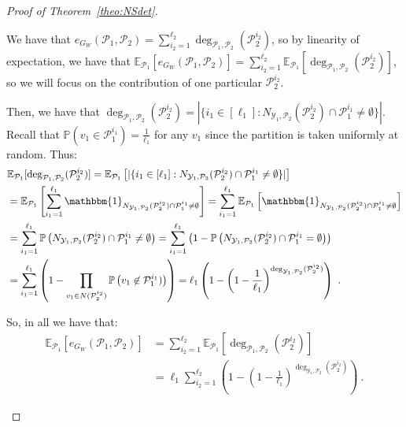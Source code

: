 \begin{proof}[Proof of Theorem~\ref{theo:NSdet}]
\begin{enumerate}
We have that $e_{G_W}(\mathcal{P}_1,\mathcal{P}_2) = \sum_{i_2=1}^{\ell_2}\deg_{\mathcal{P}_1,\mathcal{P}_2}(\mathcal{P}_2^{i_2})$, so by linearity of expectation, we have that $\mathbb{E}_{\mathcal{P}_1}[e_{G_W}(\mathcal{P}_1,\mathcal{P}_2)] = \sum_{i_2=1}^{\ell_2}\mathbb{E}_{\mathcal{P}_1}[\deg_{\mathcal{P}_1,\mathcal{P}_2}(\mathcal{P}_2^{i_2})]$, so we will focus on the contribution of one particular $\mathcal{P}_2^{i_2}$.

Then, we have that $\deg_{\mathcal{P}_1,\mathcal{P}_2}(\mathcal{P}_2^{i_2})=|\{i_1 \in [\ell_1]: N_{\mathcal{Y}_1,\mathcal{P}_2}(\mathcal{P}_2^{i_2}) \cap \mathcal{P}_1^{i_1} \not= \emptyset  \}|$. Recall that $\mathbb{P}\left(v_1 \in \mathcal{P}_1^{i_1}\right) = \frac{1}{\ell_1}$ for any $v_1$ since the partition is taken uniformly at random. Thus:
\begin{equation}
  \begin{aligned}
    &\mathbb{E}_{\mathcal{P}_1}[\deg_{\mathcal{P}_1,\mathcal{P}_2}(\mathcal{P}_2^{i_2})] = \mathbb{E}_{\mathcal{P}_1}\left[|\{i_1 \in [\ell_1]: N_{\mathcal{Y}_1,\mathcal{P}_2}(\mathcal{P}_2^{i_2}) \cap \mathcal{P}_1^{i_1} \not= \emptyset  \}|\right]\\
    &= \mathbb{E}_{\mathcal{P}_1}\left[\sum_{i_1=1}^{\ell_1} \mathbbm{1}_{N_{\mathcal{Y}_1,\mathcal{P}_2}(\mathcal{P}_2^{i_2}) \cap \mathcal{P}_1^{i_1} \not= \emptyset}\right]
    = \sum_{i_1 = 1}^{\ell_1} \mathbb{E}_{\mathcal{P}_1}\left[\mathbbm{1}_{N_{\mathcal{Y}_1,\mathcal{P}_2}(\mathcal{P}_2^{i_2}) \cap \mathcal{P}_1^{i_1} \not= \emptyset}\right]\\
    &= \sum_{i_1 = 1}^{\ell_1}\mathbb{P}\left(N_{\mathcal{Y}_1,\mathcal{P}_2}(\mathcal{P}_2^{i_2}) \cap \mathcal{P}_1^{i_1} \not= \emptyset\right)
    = \sum_{i_1 = 1}^{\ell_1}\left(1 - \mathbb{P}\left(N_{\mathcal{Y}_1,\mathcal{P}_2}(\mathcal{P}_2^{i_2}) \cap \mathcal{P}_1^{i_1} = \emptyset\right)\right)\\
    &= \sum_{i_1 = 1}^{\ell_1}\left(1 - \prod_{v_1 \in N(\mathcal{P}_2^{i_2})}\mathbb{P}\left(v_1 \not\in \mathcal{P}_1^{i_1})\right)\right) = \ell_1\left(1-\left(1-\frac{1}{\ell_1}\right)^{\deg_{\mathcal{Y}_1,\mathcal{P}_2}(\mathcal{P}_2^{i_2})}\right) \ .
  \end{aligned}
\end{equation}

So, in all we have that:
\begin{equation}
  \begin{aligned}
    \mathbb{E}_{\mathcal{P}_1}[e_{G_W}(\mathcal{P}_1,\mathcal{P}_2)] &= \sum_{i_2=1}^{\ell_2}\mathbb{E}_{\mathcal{P}_1}[\deg_{\mathcal{P}_1,\mathcal{P}_2}(\mathcal{P}_2^{i_2})]\\
    &= \ell_1\sum_{i_2=1}^{\ell_2}\left(1-\left(1-\frac{1}{\ell_1}\right)^{\deg_{\mathcal{Y}_1,\mathcal{P}_2}(\mathcal{P}_2^{i_2})}\right) \ .
  \end{aligned}
\end{equation}


\end{enumerate}
\end{proof}
